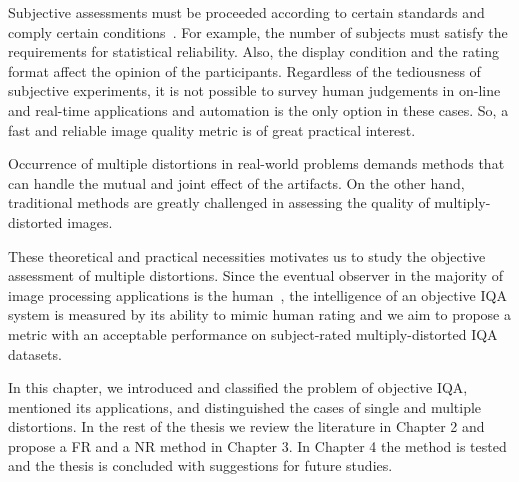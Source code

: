Subjective assessments must be proceeded according to certain standards and comply certain conditions~\cite{VQEG2000}. For example, the number of subjects must satisfy the requirements for statistical reliability. Also, the display condition and the rating format affect the opinion of the participants. Regardless of the tediousness of subjective experiments, it is not possible to survey human judgements in on-line and real-time applications and automation is the only option in these cases. So, a fast and reliable image quality metric is of great practical interest.

Occurrence of multiple distortions in real-world problems demands methods that can handle the mutual and joint effect of the artifacts. On the other hand, traditional methods are greatly challenged in assessing the quality of multiply-distorted images.

These theoretical and practical necessities motivates us to study the objective assessment of multiple distortions. Since the eventual observer in the majority of image processing applications is the human~\cite{Ghadiyaram2016}, the intelligence of an objective IQA system is measured by its ability to mimic human rating and we aim to propose a metric with an acceptable performance on subject-rated multiply-distorted IQA datasets.

In this chapter, we introduced and classified the problem of objective IQA, mentioned its applications, and distinguished the cases of single and multiple distortions. In the rest of the thesis we review the literature in Chapter 2 and propose a FR and a NR method in Chapter 3. In Chapter 4 the method is tested and the thesis is concluded with suggestions for future studies.
